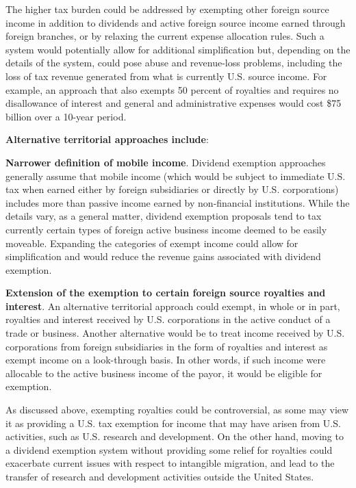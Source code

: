 \begin{select}
The higher tax burden could be addressed by exempting other foreign source 
income in addition to dividends and active foreign source income earned through foreign 
branches, or by relaxing the current expense allocation rules.  Such a system would 
potentially allow for additional simplification but, depending on the details of the system, 
could pose abuse and revenue-loss problems, including the loss of tax revenue generated 
from what is currently U.S. source income.  For example, an approach that also exempts 
50 percent of royalties and requires no disallowance of interest and general and 
administrative expenses would cost \$75 billion over a 10-year period.   
 
\begin{center}
\textbf{Alternative territorial approaches include}: 
\end{center}
 
\textbf{Narrower definition of mobile income}.  Dividend exemption approaches generally 
assume that mobile income (which would be subject to immediate U.S. tax when earned 
either by foreign subsidiaries or directly by U.S. corporations) includes more than passive 
income earned by non-financial institutions.  While the details vary, as a general matter, 
dividend exemption proposals tend to tax currently certain types of foreign active 
business income deemed to be easily moveable.  Expanding the categories of exempt 
income could allow for simplification and would reduce the revenue gains associated 
with dividend exemption.   
 
\textbf{Extension of the exemption to certain foreign source royalties and interest}.  An 
alternative territorial approach could exempt, in whole or in part, royalties and interest 
received by U.S. corporations in the active conduct of a trade or business.  Another 
alternative would be to treat income received by U.S. corporations from foreign 
subsidiaries in the form of royalties and interest as exempt income on a look-through 
basis.  In other words, if such income were allocable to the active business income of the 
payor, it would be eligible for exemption.   
 
As discussed above, exempting royalties could be controversial, as some may 
view it as providing a U.S. tax exemption for income that may have arisen from U.S. 
activities, such as U.S. research and development.  On the other hand, moving to a 
dividend exemption system without providing some relief for royalties could exacerbate 
current issues with respect to intangible migration, and lead to the transfer of research 
and development activities outside the United States. 
 

\end{select}
